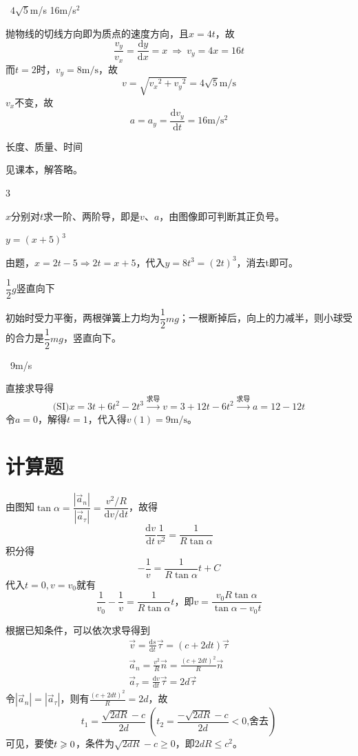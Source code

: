 \documentclass[b5paper,opensource,sourcefont,parskip]{qyxf-book}
\newcommand{\di}[1]{\mathrm{d}#1}
\newcommand{\dy}[2]{\frac{\di{#1}}{\di{#2}}}
\begin{document}
\ $4\sqrt{5}$m/s \qquad 16m/s${}^2$ 

\solve 抛物线的切线方向即为质点的速度方向，且$x=4t$，故
\[\dfrac{v_y}{v_x}=\dy{y}{x}=x\ \Rightarrow\ v_y=4x=16t\]
而$t=2$时，$v_y=8\mathrm{m/s}$，故
\[v=\sqrt{{v_x}^2+{v_y}^2}=4\sqrt{5}\mathrm{m/s}\]
$v_x$不变，故
\[a=a_y=\dy{v_y}{t}=16\mathrm{m/s^2}\]

 长度、质量、时间

\solve 见课本，解答略。

 3

\solve $x$分别对$t$求一阶、两阶导，即是$v$、$a$，由图像即可判断其正负号。

 $y={(x+5)}^3$

\solve 由题，$x=2t-5\Rightarrow 2t=x+5$，代入$y=8t^3={(2t)}^3$，消去t即可。

 $\dfrac{1}{2}g$\qquad 竖直向下

\solve 初始时受力平衡，两根弹簧上力均为$\dfrac{1}{2}mg$；一根断掉后，向上的力减半，则小球受的合力是$\dfrac{1}{2}mg$，竖直向下。

\ 9m/s 

\solve 直接求导得
\[\text{(SI)} x=3t+6t^2-2t^3\xrightarrow{\text{求导}}v=3+12t-6t^2
\xrightarrow{\text{求导}}a=12-12t\]
令$a=0$，解得$t=1$，代入得$v(1)=9\mathrm{m/s}$。

\section{计算题}



\solve 由图知$\tan\alpha=\dfrac{|\vec{a}_n|}{|\vec{a}_\tau|}=\dfrac{v^2/R}{\di{v}/\di{t}}$，故得
\[\dy{v}{t}\frac{1}{v^2}=\frac{1}{R\tan\alpha}\]
积分得
\[-\frac{1}{v}=\frac{1}{R\tan\alpha}t+C\]
代入$t=0,v=v_0$就有
\[\frac{1}{v_0}-\frac{1}{v}=\frac{1}{R\tan\alpha}t
\text{，即}v=\frac{v_0R\tan\alpha}{\tan\alpha-v_0t}
\]


\solve 根据已知条件，可以依次求导得到
\begin{gather*}
\vec{v}=\dy{s}{t}\vec{\tau}=(c+2dt)\vec{\tau}\\  
\vec{a}_n=\frac{v^2}{R}\vec{n}=\frac{(c+2dt)^2}{R}\vec{n}\\
\vec{a}_\tau=\dy{v}{t}\vec{\tau}=2d\vec{\tau}
\end{gather*}
令$|\vec{a}_n|=|\vec{a}_\tau|$，则有$\frac{(c+2dt)^2}{R}=2d$，故
\[t_1=\frac{\sqrt{2dR}-c}{2d}\ \left(t_2=\frac{-\sqrt{2dR}-c}{2d}<0\text{,舍去}\right)\]
可见，要使$t\geqslant\text0$，条件为$\sqrt{2dR}-c\geqslant0$，即$2dR\leqslant c^2$。
\end{document}
